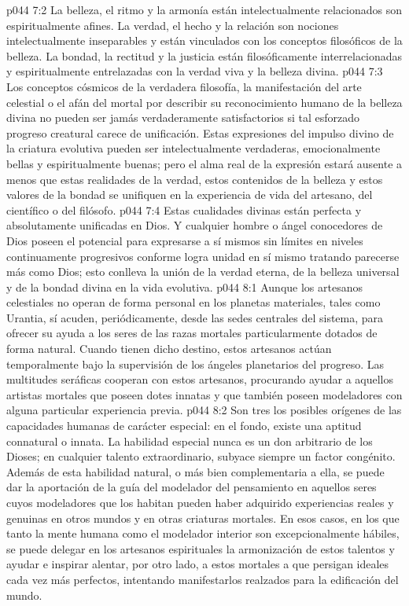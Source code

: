 \vs p044 7:2 La belleza, el ritmo y la armonía están intelectualmente relacionados son espiritualmente afines. La verdad, el hecho y la relación son nociones intelectualmente inseparables y están vinculados con los conceptos filosóficos de la belleza. La bondad, la rectitud y la justicia están filosóficamente interrelacionadas y espiritualmente entrelazadas con la verdad viva y la belleza divina.
\vs p044 7:3 Los conceptos cósmicos de la verdadera filosofía, la manifestación del arte celestial o el afán del mortal por describir su reconocimiento humano de la belleza divina no pueden ser jamás verdaderamente satisfactorios si tal esforzado progreso creatural carece de unificación. Estas expresiones del impulso divino de la criatura evolutiva pueden ser intelectualmente verdaderas, emocionalmente bellas y espiritualmente buenas; pero el alma real de la expresión estará ausente a menos que estas realidades de la verdad, estos contenidos de la belleza y estos valores de la bondad se unifiquen en la experiencia de vida del artesano, del científico o del filósofo.
\vs p044 7:4 Estas cualidades divinas están perfecta y absolutamente unificadas en Dios. Y cualquier hombre o ángel conocedores de Dios poseen el potencial para expresarse a sí mismos sin límites en niveles continuamente progresivos conforme logra unidad en sí mismo tratando parecerse más como Dios; esto conlleva la unión de la verdad eterna, de la belleza universal y de la bondad divina en la vida evolutiva.
\vs p044 8:1 Aunque los artesanos celestiales no operan de forma personal en los planetas materiales, tales como Urantia, sí acuden, periódicamente, desde las sedes centrales del sistema, para ofrecer su ayuda a los seres de las razas mortales particularmente dotados de forma natural. Cuando tienen dicho destino, estos artesanos actúan temporalmente bajo la supervisión de los ángeles planetarios del progreso. Las multitudes seráficas cooperan con estos artesanos, procurando ayudar a aquellos artistas mortales que poseen dotes innatas y que también poseen modeladores con alguna particular experiencia previa.
\vs p044 8:2 Son tres los posibles orígenes de las capacidades humanas de carácter especial: en el fondo,  existe una aptitud connatural o innata. La habilidad especial nunca es un don arbitrario de los Dioses; en cualquier talento extraordinario, subyace siempre un factor congénito. Además de esta habilidad natural, o más bien complementaria a ella, se puede dar la aportación de la guía del modelador del pensamiento en aquellos seres cuyos modeladores que los habitan pueden haber adquirido experiencias reales y genuinas en otros mundos y en otras criaturas mortales. En esos casos, en los que tanto la mente humana como el modelador interior son excepcionalmente hábiles, se puede delegar en los artesanos espirituales la armonización de estos talentos y ayudar e inspirar alentar, por otro lado, a estos mortales a que persigan ideales cada vez más perfectos, intentando manifestarlos realzados para la edificación del mundo.
